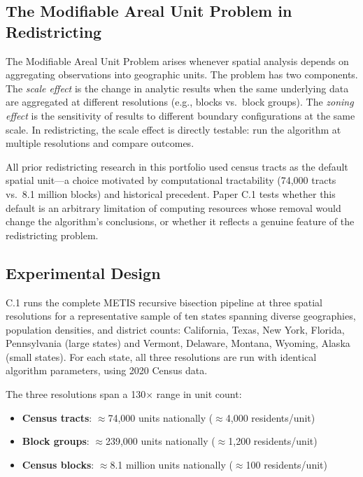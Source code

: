 
\subsection{The Modifiable Areal Unit Problem in Redistricting}

The Modifiable Areal Unit Problem \citep{openshaw1984modifiable} arises
whenever spatial analysis depends on aggregating observations into
geographic units. The problem has two components. The \emph{scale effect}
is the change in analytic results when the same underlying data are
aggregated at different resolutions (e.g., blocks vs.\ block groups).
The \emph{zoning effect} is the sensitivity of results to different
boundary configurations at the same scale. In redistricting, the scale
effect is directly testable: run the algorithm at multiple resolutions
and compare outcomes.

All prior redistricting research in this portfolio used census tracts
as the default spatial unit---a choice motivated by computational
tractability (74,000 tracts vs.\ 8.1 million blocks) and historical
precedent. Paper C.1 \citep{dellalibera2026c1} tests whether this
default is an arbitrary limitation of computing resources whose removal
would change the algorithm's conclusions, or whether it reflects a
genuine feature of the redistricting problem.

\subsection{Experimental Design}

C.1 runs the complete METIS recursive bisection pipeline at three
spatial resolutions for a representative sample of ten states spanning
diverse geographies, population densities, and district counts:
California, Texas, New York, Florida, Pennsylvania (large states) and
Vermont, Delaware, Montana, Wyoming, Alaska (small states). For each
state, all three resolutions are run with identical algorithm parameters,
using 2020 Census data.

The three resolutions span a 130$\times$ range in unit count:
\begin{itemize}
  \item \textbf{Census tracts}: $\approx$74,000 units nationally
    ($\approx$4,000 residents/unit)
  \item \textbf{Block groups}: $\approx$239,000 units nationally
    ($\approx$1,200 residents/unit)
  \item \textbf{Census blocks}: $\approx$8.1 million units nationally
    ($\approx$100 residents/unit)
\end{itemize}

